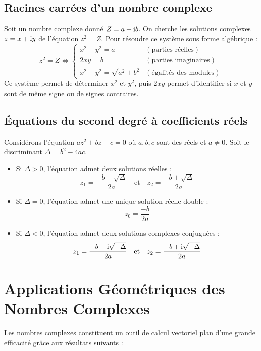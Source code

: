 \subsection{Racines carrées d'un nombre complexe}
Soit un nombre complexe donné $Z = a + \mathrm{i} b$. On cherche les solutions complexes $z = x + \mathrm{i} y$ de l'équation $z^2 = Z$.
Pour résoudre ce système sous forme algébrique :
\[
z^2 = Z \iff 
\begin{cases}
x^2 - y^2 = a & (\text{parties réelles}) \\
2xy = b & (\text{parties imaginaires}) \\
x^2 + y^2 = \sqrt{a^2+b^2} & (\text{égalités des modules})
\end{cases}
\]
Ce système permet de déterminer $x^2$ et $y^2$, puis $2xy$ permet d'identifier si $x$ et $y$ sont de même signe ou de signes contraires.

\subsection{Équations du second degré à coefficients réels}

\begin{theoreme}
Considérons l'équation $az^2 + bz + c = 0$ où $a, b, c$ sont des réels et $a \ne 0$.
Soit le discriminant $\Delta = b^2 - 4ac$.
\begin{itemize}
    \item Si $\Delta > 0$, l'équation admet deux solutions réelles :
    \[
    z_1 = \frac{-b-\sqrt{\Delta}}{2a} \quad \text{et} \quad z_2 = \frac{-b+\sqrt{\Delta}}{2a}
    \]
    \item Si $\Delta = 0$, l'équation admet une unique solution réelle double :
    \[
    z_0 = \frac{-b}{2a}
    \]
    \item Si $\Delta < 0$, l'équation admet deux solutions complexes conjuguées :
    \[
    z_1 = \frac{-b-\mathrm{i}\sqrt{-\Delta}}{2a} \quad \text{et} \quad z_2 = \frac{-b+\mathrm{i}\sqrt{-\Delta}}{2a}
    \]
\end{itemize}
\end{theoreme}

\section{Applications Géométriques des Nombres Complexes}

Les nombres complexes constituent un outil de calcul vectoriel plan d'une grande efficacité grâce aux résultats suivants :

